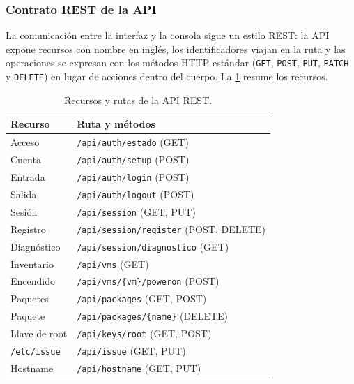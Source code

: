 \subsubsection{Contrato REST de la API}
\label{sec:contrato-rest}

La comunicación entre la interfaz y la consola sigue un estilo REST: la
API expone recursos con nombre en inglés, los identificadores viajan en
la ruta y las operaciones se expresan con los métodos HTTP estándar
(\texttt{GET}, \texttt{POST}, \texttt{PUT}, \texttt{PATCH} y
\texttt{DELETE}) en lugar de acciones dentro del cuerpo. La
\cref{tab:api-rest} resume los recursos.

\begin{table}[!t]
  \centering
  \caption{Recursos y rutas de la API REST.}
  \label{tab:api-rest}
  \footnotesize
  \begin{tabularx}{\columnwidth}{@{}l >{\raggedright\arraybackslash}X@{}}
    \hline
    Recurso & Ruta y métodos \\
    \hline
    Acceso & \texttt{/api/\allowbreak auth/\allowbreak estado} (GET) \\
    Cuenta & \texttt{/api/\allowbreak auth/\allowbreak setup} (POST) \\
    Entrada & \texttt{/api/\allowbreak auth/\allowbreak login} (POST) \\
    Salida & \texttt{/api/\allowbreak auth/\allowbreak logout} (POST) \\
    Sesión & \texttt{/api/\allowbreak session} (GET, PUT) \\
    Registro & \texttt{/api/\allowbreak session/\allowbreak register} (POST, DELETE) \\
    Diagnóstico & \texttt{/api/\allowbreak session/\allowbreak diagnostico} (GET) \\
    Inventario & \texttt{/api/\allowbreak vms} (GET) \\
    Encendido & \texttt{/api/\allowbreak vms/\allowbreak\{vm\}/\allowbreak poweron} (POST) \\
    Paquetes & \texttt{/api/\allowbreak packages} (GET, POST) \\
    Paquete & \texttt{/api/\allowbreak packages/\allowbreak\{name\}} (DELETE) \\
    Llave de root & \texttt{/api/\allowbreak keys/\allowbreak root} (GET, POST) \\
    \texttt{/etc/issue} & \texttt{/api/\allowbreak issue} (GET, PUT) \\
    Hostname & \texttt{/api/\allowbreak hostname} (GET, PUT) \\

\end{tabularx}
\end{table}
